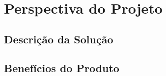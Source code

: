 \chapter[Perspectiva do Projeto]{Perspectiva do Projeto}

{\large {\section {Descrição da Solução}}}
{\large {\section {Benefícios do Produto}}}